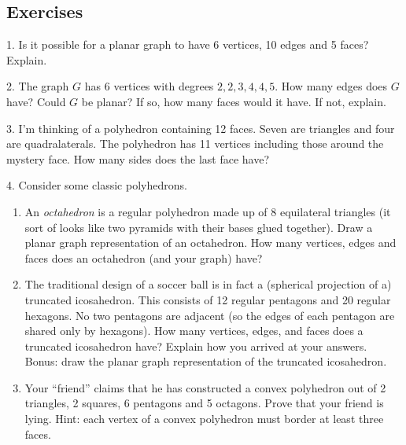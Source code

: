 \documentclass[10pt,]{book}
\theoremstyle{plain}
\theoremstyle{definition}
\theoremstyle{definition}
\theoremstyle{definition}
\theoremstyle{definition}
\numberwithin{equation}{chapter}
\begin{document}
\subsection[{Exercises}]{Exercises}\label{exercises_gt-planar}
\begin{exerciselist}
\item[1.]\hypertarget{exercise-179}{}\hypertarget{p-1622}{}%
Is it possible for a planar graph to have 6 vertices, 10 edges and 5 faces? Explain.%
\par\smallskip
\item[2.]\hypertarget{exercise-180}{}\hypertarget{p-1624}{}%
The graph \(G\) has 6 vertices with degrees \(2, 2, 3, 4, 4, 5\). How many edges does \(G\) have? Could \(G\) be planar? If so, how many faces would it have.  If not, explain.%
\par\smallskip
\item[3.]\hypertarget{exercise-181}{}\hypertarget{p-1626}{}%
I'm thinking of a polyhedron containing 12 faces. Seven are triangles and four are quadralaterals. The polyhedron has 11 vertices including those around the mystery face. How many sides does the last face have?%
\par\smallskip
\item[4.]\hypertarget{exercise-182}{}\hypertarget{p-1628}{}%
Consider some classic polyhedrons. \leavevmode%
\begin{enumerate}[label=(\alph*)]
\item\hypertarget{li-723}{}\hypertarget{p-1629}{}%
An \emph{octahedron} is a regular polyhedron made up of 8 equilateral triangles (it sort of looks like two pyramids with their bases glued together). Draw a planar graph representation of an octahedron. How many vertices, edges and faces does an octahedron (and your graph) have? %
\item\hypertarget{li-724}{}\hypertarget{p-1630}{}%
The traditional design of a soccer ball is in fact a (spherical projection of a) truncated icosahedron. This consists of 12 regular pentagons and 20 regular hexagons. No two pentagons are adjacent (so the edges of each pentagon are shared only by hexagons). How many vertices, edges, and faces does a truncated icosahedron have? Explain how you arrived at your answers. Bonus: draw the planar graph representation of the truncated icosahedron. %
\item\hypertarget{li-725}{}\hypertarget{p-1631}{}%
Your ``friend'' claims that he has constructed a convex polyhedron out of 2 triangles, 2 squares, 6 pentagons and 5 octagons. Prove that your friend is lying. Hint: each vertex of a convex polyhedron must border at least three faces. %

\end{enumerate}
\end{exerciselist}
\end{document}

